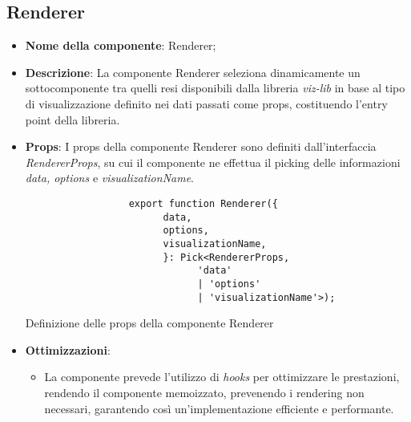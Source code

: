 \subsection{Renderer}
\begin{itemize}
\item \textbf{Nome della componente}: Renderer;
\item \textbf{Descrizione}: La componente Renderer seleziona dinamicamente un sottocomponente tra quelli resi disponibili dalla libreria \textit{viz-lib}
in base al tipo di visualizzazione definito nei dati passati come props, costituendo l'entry point della libreria. \newline
\item \textbf{Props}: I props della componente Renderer sono definiti dall'interfaccia \textit{RendererProps}, su cui il componente ne effettua il picking
delle informazioni \textit{data, options} e \textit{visualizationName}.
\begin{listing}[H]
      \begin{verbatim}
                  export function Renderer({
                        data,
                        options,
                        visualizationName,
                        }: Pick<RendererProps, 
                              'data' 
                              | 'options' 
                              | 'visualizationName'>);
                  \end{verbatim}
      \caption{Definizione delle props della componente Renderer}
      \label{listing:rendererPropsInComponent}
\end{listing}
\item \textbf{Ottimizzazioni}:
\begin{itemize}
      \item La componente prevede l'utilizzo di \textit{hooks} per ottimizzare le prestazioni, rendendo il componente memoizzato, prevenendo i rendering
            non necessari, garantendo così un'implementazione efficiente e performante.
\end{itemize}


\end{itemize}
